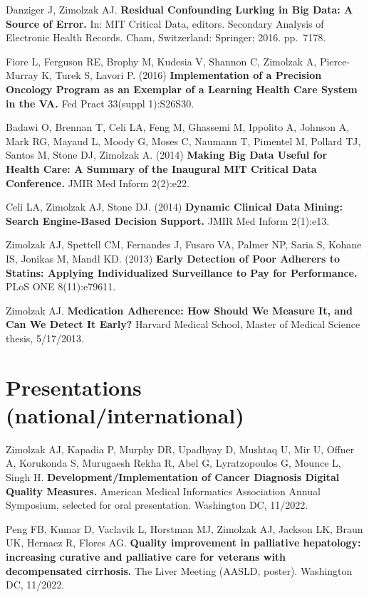 \documentclass[10pt]{article}
\begin{document}
Danziger J, Zimolzak AJ. \textbf{Residual Confounding Lurking in Big
  Data: A Source of Error.} In: MIT Critical Data, editors. Secondary
Analysis of Electronic Health Records. Cham, Switzerland: Springer;
2016. pp.\ 71\ndash{}78.

Fiore L, Ferguson RE, Brophy M, Kudesia V, Shannon C, Zimolzak A,
Pierce-Murray K, Turek S, Lavori P. (2016) \textbf{Implementation of a
  Precision Oncology Program as an Exemplar of a Learning Health Care
  System in the VA.} Fed Pract 33(suppl 1):S26\ndash{}S30.

Badawi O, Brennan T, Celi LA, Feng M, Ghassemi M, Ippolito A, Johnson
A, Mark RG, Mayaud L, Moody G, Moses C, Naumann T, Pimentel M, Pollard
TJ, Santos M, Stone DJ, Zimolzak A. (2014) \textbf{Making Big Data
  Useful for Health Care: A Summary of the Inaugural MIT Critical Data
  Conference.} JMIR Med Inform 2(2):e22.

Celi LA, Zimolzak AJ, Stone DJ. (2014) \textbf{Dynamic Clinical Data
  Mining: Search Engine-Based Decision Support.} JMIR Med Inform
2(1):e13.

Zimolzak AJ, Spettell CM, Fernandes J, Fusaro VA, Palmer NP, Saria S,
Kohane IS, Jonikas M, Mandl KD. (2013) \textbf{Early Detection of Poor
  Adherers to Statins: Applying Individualized Surveillance to Pay for
  Performance.} PLoS ONE 8(11):e79611.

Zimolzak AJ. \textbf{Medication Adherence: How Should We Measure It,
  and Can We Detect It Early?} Harvard Medical School, Master of
Medical Science thesis, 5/17/2013.




\section*{Presentations (national/international)} %

Zimolzak AJ, Kapadia P, Murphy DR, Upadhyay D, Mushtaq U, Mir U,
Offner A, Korukonda S, Murugaesh Rekha R, Abel G, Lyratzopoulos G,
Mounce L, Singh H. \textbf{Development/Implementation of Cancer
  Diagnosis Digital Quality Measures.} American Medical Informatics
Association Annual Symposium, selected for oral presentation.
Washington DC, 11/2022.

Peng FB, Kumar D, Vaclavik L, Horstman MJ, Zimolzak AJ, Jackson LK,
Braun UK, Hernaez R, Flores AG. \textbf{Quality improvement in
  palliative hepatology: increasing curative and palliative care for
  veterans with decompensated cirrhosis.} The Liver Meeting (AASLD,
poster). Washington DC, 11/2022.
\end{document}

